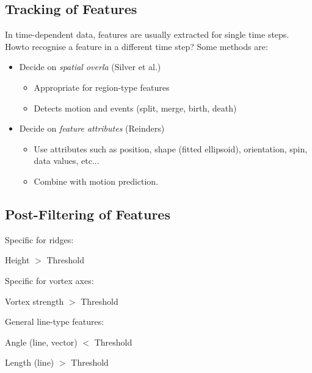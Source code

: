 \subsection{Tracking of Features}
In time-dependent data, features are usually extracted for single time steps. Howto recognise a feature in a different time step?
Some methods are:
\begin{itemize}
    \item Decide on \emph{spatial overla} (Silver et al.)
        \begin{itemize}
            \item Appropriate for region-type features
            \item Detects motion and events (split, merge, birth, death)
        \end{itemize}
    \item Decide on \emph{feature attributes} (Reinders)
        \begin{itemize}
            \item Use attributes such as position, shape (fitted ellipsoid), orientation, spin, data values, etc...
            \item Combine with motion prediction.
        \end{itemize}
\end{itemize}

\subsection{Post-Filtering of Features}
\begin{description}
\item Specific for ridges:

    Height $>$ Threshold
\item Specific for vortex axes:

    Vortex strength $>$ Threshold
    
\item General line-type features:

    \begin{description}
        \item Angle (line, vector) $<$ Threshold
        \item Length (line) $>$ Threshold
    \end{description}
\end{description}



















